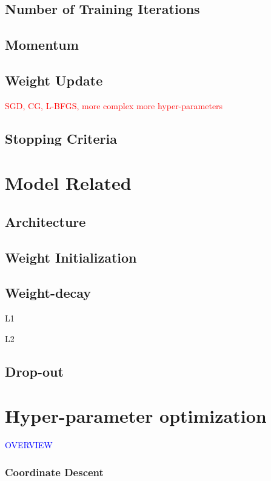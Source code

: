 \subsection{Number of Training Iterations}

\subsection{Momentum}

\subsection{Weight Update}

\textcolor{red}{SGD, CG, L-BFGS, more complex more hyper-parameters}

\subsection{Stopping Criteria}

\section{Model Related}

\subsection{Architecture}

\subsection{Weight Initialization}

\subsection{Weight-decay}

L1

L2

\subsection{Drop-out}

\section{Hyper-parameter optimization}

\textcolor{blue}{OVERVIEW}

\subsubsection{Coordinate Descent}

